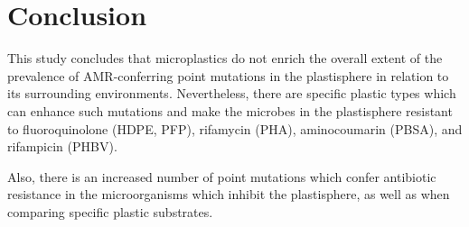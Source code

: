 \chapter{Conclusion}


This study concludes that microplastics do not enrich the overall extent of the prevalence of AMR-conferring point mutations in the plastisphere in relation to its surrounding environments. 
Nevertheless, there are specific plastic types which can enhance such mutations and make the microbes in the plastisphere resistant to fluoroquinolone (HDPE, PFP), rifamycin (PHA), aminocoumarin (PBSA), and rifampicin (PHBV).

Also, there is an increased number of point mutations which confer antibiotic resistance in the microorganisms which inhibit the plastisphere, as well as when comparing specific plastic substrates.

